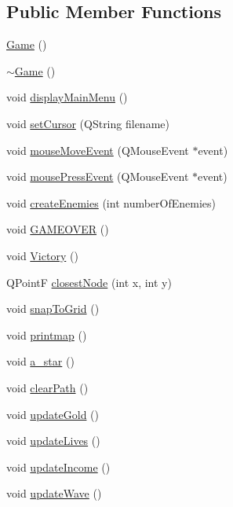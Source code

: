 \subsection*{Public Member Functions}
\begin{DoxyCompactItemize}
\item 
\hyperlink{class_game_ad59df6562a58a614fda24622d3715b65}{Game} ()
\item 
\hyperlink{class_game_ae3d112ca6e0e55150d2fdbc704474530}{$\sim$\+Game} ()
\item 
void \hyperlink{class_game_af74fd203e3b31917ca9d4769fa608c48}{display\+Main\+Menu} ()
\item 
void \hyperlink{class_game_a7272e282812b8af0be83044db196dc6c}{set\+Cursor} (Q\+String filename)
\item 
void \hyperlink{class_game_ad761e49ff42758930e76b477d08ba068}{mouse\+Move\+Event} (Q\+Mouse\+Event $\ast$event)
\item 
void \hyperlink{class_game_a704ba119948eebd1b6dfc547de967796}{mouse\+Press\+Event} (Q\+Mouse\+Event $\ast$event)
\item 
void \hyperlink{class_game_a622303239641db82911ea67bde3ba1a0}{create\+Enemies} (int number\+Of\+Enemies)
\item 
void \hyperlink{class_game_a838e89640d4cfbd7d7b7ee105135d4b8}{G\+A\+M\+E\+O\+V\+ER} ()
\item 
void \hyperlink{class_game_af310eb8cf154b512e2ae488267495c96}{Victory} ()
\item 
Q\+PointF \hyperlink{class_game_ae0adfbcc271a45a2c3ede2c6b948beda}{closest\+Node} (int x, int y)
\item 
void \hyperlink{class_game_a4e2cc66ce5004779048a6d8de19f0cdc}{snap\+To\+Grid} ()
\item 
void \hyperlink{class_game_a07ca125130662de9c8f3bdd2f61db9c9}{printmap} ()
\item 
void \hyperlink{class_game_aa3d45b075393d6751f77db3ce31ab9ba}{a\+\_\+star} ()
\item 
void \hyperlink{class_game_a06f5d66abdaae753db91ce7884c4e57d}{clear\+Path} ()
\item 
void \hyperlink{class_game_a065998f7609f63e2987ede928359595a}{update\+Gold} ()
\item 
void \hyperlink{class_game_aa5e4edca458d1a1378d035a138d69635}{update\+Lives} ()
\item 
void \hyperlink{class_game_a5a6924497d779286af09f339d4c7a598}{update\+Income} ()
\item 
void \hyperlink{class_game_a108f0ed818f5d32e3e5b350497edc481}{update\+Wave} ()
\end{DoxyCompactItemize}
